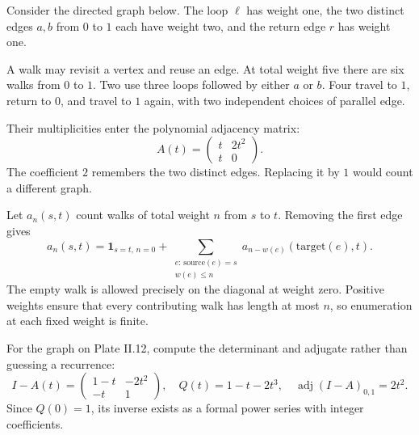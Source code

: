 
Consider the directed graph below. The loop $\ell$ has weight one, the two distinct edges $a,b$ from $0$ to $1$ each have weight two, and the return edge $r$ has weight one.


A walk may revisit a vertex and reuse an edge. At total weight five there are six walks from $0$ to $1$. Two use three loops followed by either $a$ or $b$. Four travel to $1$, return to $0$, and travel to $1$ again, with two independent choices of parallel edge.

Their multiplicities enter the polynomial adjacency matrix:
\[
A(t)=\begin{pmatrix}t&2t^2\\t&0\end{pmatrix}.
\]
The coefficient $2$ remembers the two distinct edges. Replacing it by $1$ would count a different graph.

Let $a_n(s,t)$ count walks of total weight $n$ from $s$ to $t$. Removing the first edge gives
\[
a_n(s,t)=\mathbf1_{s=t,\,n=0}
 +\sum_{\substack{e:\,\mathrm{source}(e)=s\\w(e)\le n}}
 a_{n-w(e)}(\mathrm{target}(e),t).
\]
The empty walk is allowed precisely on the diagonal at weight zero. Positive weights ensure that every contributing walk has length at most $n$, so enumeration at each fixed weight is finite.


For the graph on Plate II.12, compute the determinant and adjugate rather than guessing a recurrence:
\[
I-A(t)=\begin{pmatrix}1-t&-2t^2\\-t&1\end{pmatrix},
\quad Q(t)=1-t-2t^3,
\quad \operatorname{adj}(I-A)_{0,1}=2t^2.
\]
Since $Q(0)=1$, its inverse exists as a formal power series with integer coefficients.

